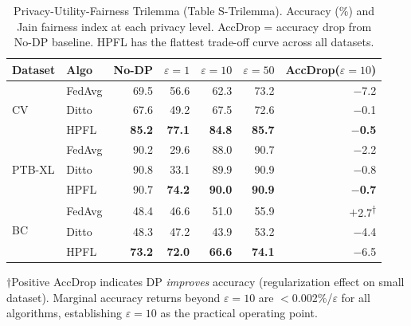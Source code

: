 \documentclass[conference]{IEEEtran}
\begin{document}
\begin{table}[!ht]
\centering
\caption{Privacy-Utility-Fairness Trilemma (Table S-Trilemma). Accuracy (\%) and Jain fairness index at each privacy level. AccDrop = accuracy drop from No-DP baseline. HPFL has the flattest trade-off curve across all datasets.}
\label{tab:s_trilemma}
\scriptsize
\begin{tabular}{llrrrrr}
\toprule
\textbf{Dataset} & \textbf{Algo} & \textbf{No-DP} & \textbf{$\varepsilon{=}1$} & \textbf{$\varepsilon{=}10$} & \textbf{$\varepsilon{=}50$} & \textbf{AccDrop($\varepsilon{=}10$)} \\
\midrule
\multirow{3}{*}{CV} & FedAvg & 69.5 & 56.6 & 62.3 & 73.2 & $-$7.2 \\
 & Ditto & 67.6 & 49.2 & 67.5 & 72.6 & $-$0.1 \\
 & HPFL & \textbf{85.2} & \textbf{77.1} & \textbf{84.8} & \textbf{85.7} & \textbf{$-$0.5} \\
\midrule
\multirow{3}{*}{PTB-XL} & FedAvg & 90.2 & 29.6 & 88.0 & 90.7 & $-$2.2 \\
 & Ditto & 90.8 & 33.1 & 89.9 & 90.9 & $-$0.8 \\
 & HPFL & 90.7 & \textbf{74.2} & \textbf{90.0} & \textbf{90.9} & \textbf{$-$0.7} \\
\midrule
\multirow{3}{*}{BC} & FedAvg & 48.4 & 46.6 & 51.0 & 55.9 & $+$2.7\textsuperscript{$\dagger$} \\
 & Ditto & 48.3 & 47.2 & 43.9 & 53.2 & $-$4.4 \\
 & HPFL & \textbf{73.2} & \textbf{72.0} & \textbf{66.6} & \textbf{74.1} & $-$6.5 \\
\bottomrule
\end{tabular}

\vspace{1mm}
\footnotesize{$\dagger$Positive AccDrop indicates DP \textit{improves} accuracy (regularization effect on small dataset). Marginal accuracy returns beyond $\varepsilon{=}10$ are $<$0.002\%/$\varepsilon$ for all algorithms, establishing $\varepsilon{=}10$ as the practical operating point.}
\end{table}
\end{document}
